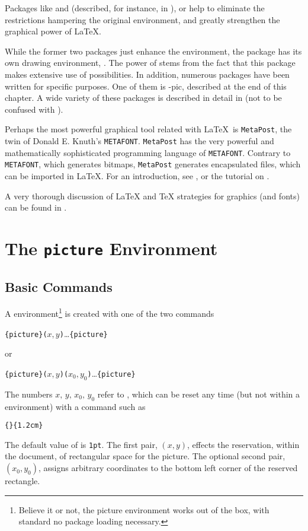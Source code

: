 Packages like  and  (described, for instance, in \companion), or
 help to eliminate the restrictions hampering the original  
environment, and greatly strengthen the graphical power of \LaTeX.

While the former two packages just enhance the  environment, the 
package has its own drawing environment, . The power of  stems
from the fact that this package makes extensive use of \PSi{} possibilities.
In addition, numerous packages have been written for specific purposes. One of them is
\texorpdfstring{\Xy}{Xy}-pic, described at the end of this chapter. A wide variety of these
packages is described in detail in \graphicscompanion{} (not to be confused with \companion).

Perhaps the most powerful graphical tool related with \LaTeX\ is \texttt{MetaPost}, the twin of
Donald E. Knuth's \texttt{METAFONT}. \texttt{MetaPost} has the very powerful and 
mathematically sophisticated programming language of \texttt{METAFONT}. Contrary to \texttt{METAFONT},
which generates bitmaps, \texttt{MetaPost} generates encapsulated \PSi{} files, 
which can be imported in \LaTeX. For an introduction, see \hobby, or the tutorial on \cite{ursoswald}.

A very thorough discussion of \LaTeX{} and \TeX{} strategies for graphics (and fonts) can 
be found in \hoenig.

\section{The \texttt{picture} Environment}

\subsection{Basic Commands}

A  environment\footnote{Believe it or not, the picture environment works out of the
box, with standard \LaTeXe{} no package loading necessary.} is created with one of the two commands
\begin{lscommand}
\verb|{picture}(|$x,y$\verb|)|\ldots{}\verb|{picture}|
\end{lscommand}
\noindent or
\begin{lscommand}
\verb|{picture}(|$x,y$\verb|)(|$x_0,y_0$\verb|)|\ldots{}\verb|{picture}|
\end{lscommand}
The numbers $x,\,y,\,x_0,\,y_0$ refer to , which can be reset any time
(but not within a  environment) with a command such as
\begin{lscommand}
\verb|{|\verb|}{1.2cm}|
\end{lscommand}
The default value of  is \texttt{1pt}. The first pair, $(x,y)$, effects
the reservation, within the document, of rectangular space for the picture. The optional
second pair, $(x_0,y_0)$, assigns arbitrary coordinates to the bottom left corner of the
reserved rectangle. 


